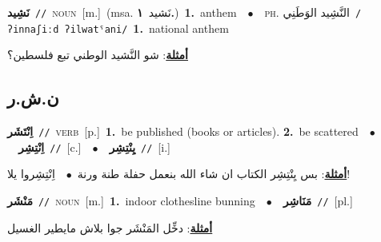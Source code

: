 \documentclass[10pt,a4paper,twoside]{article} %
\begin{document}
\begin{multicols}{2}
{\setlength\topsep{0pt}\textbf{\foreignlanguage{arabic}{نَشِيد}}\ {\color{gray}\texttt{//}\color{black}}\ \textsc{noun}\ [m.]\ \color{gray}(msa. \foreignlanguage{arabic}{نَشيد}~\foreignlanguage{arabic}{\textbf{١.}})\color{black}\ \textbf{1.}~anthem\ \ $\bullet$\ \ \textsc{ph.} \color{gray} \foreignlanguage{arabic}{النَّشِيد الوَطَنِي}\color{black}\ {\color{gray}\texttt{/{\sffamily ʔinnaʃiːd ʔilwatˤani}/}\color{black}}\ \textbf{1.}~national anthem\  \begin{flushright}\color{gray}\foreignlanguage{arabic}{\textbf{\underline{\foreignlanguage{arabic}{أمثلة}}}: شو النَّشيد الوطني تبع فلسطين؟}\end{flushright}\color{black}} \vspace{2mm}

\vspace{-3mm}
\subsection*{\color{blue}\foreignlanguage{arabic}{ن.ش.ر}\color{blue}{}} 

{\setlength\topsep{0pt}\textbf{\foreignlanguage{arabic}{اِنْتَشَر}}\ {\color{gray}\texttt{//}\color{black}}\ \textsc{verb}\ [p.]\ \textbf{1.}~be published (books or articles).  \textbf{2.}~be scattered\ \ $\bullet$\ \ \setlength\topsep{0pt}\textbf{\foreignlanguage{arabic}{اِنْتِشِر}}\ {\color{gray}\texttt{//}\color{black}}\ [c.]\ \ $\bullet$\ \ \setlength\topsep{0pt}\textbf{\foreignlanguage{arabic}{يِنْتِشِر}}\ {\color{gray}\texttt{//}\color{black}}\ [i.]\  \begin{flushright}\color{gray}\foreignlanguage{arabic}{\textbf{\underline{\foreignlanguage{arabic}{أمثلة}}}: بس يِنْتِشِر الكتاب ان شاء الله بنعمل حفلة طنة ورنة\ $\bullet$\ \  اِنْتِشِروا يلا!}\end{flushright}\color{black}} \vspace{2mm}

{\setlength\topsep{0pt}\textbf{\foreignlanguage{arabic}{مَنْشَر}}\ {\color{gray}\texttt{//}\color{black}}\ \textsc{noun}\ [m.]\ \textbf{1.}~indoor clothesline bunning\ \ $\bullet$\ \ \setlength\topsep{0pt}\textbf{\foreignlanguage{arabic}{مَنَاشِر}}\ {\color{gray}\texttt{//}\color{black}}\ [pl.]\  \begin{flushright}\color{gray}\foreignlanguage{arabic}{\textbf{\underline{\foreignlanguage{arabic}{أمثلة}}}: دخِّل المَنْشَر جوا بلاش مايطير الغسيل}\end{flushright}\color{black}} \vspace{2mm}


\end{multicols}
\end{document}
